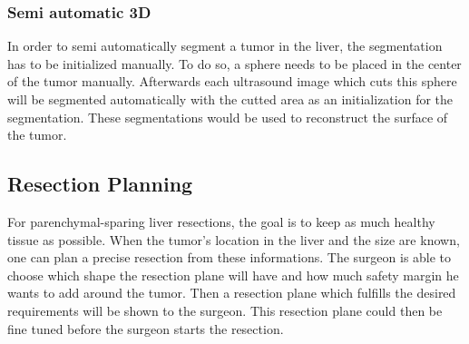 \subsubsection{Semi automatic 3D}
In order to semi automatically segment a tumor in the liver, the segmentation
has to be initialized manually. To do so, a sphere needs to be
placed in the center of the tumor manually. Afterwards each ultrasound image
which cuts this sphere will be segmented automatically with the cutted area as
an initialization for the segmentation. These segmentations would be used to
reconstruct the surface of the tumor.
\subsection{Resection Planning}
For parenchymal-sparing liver resections, the goal is to keep as much healthy tissue as
possible. When the tumor's location in the liver and the size are known, one can plan a
precise resection from these informations. The surgeon is able to choose
which shape the resection plane will have and how much safety margin he wants to
add around the tumor. Then a resection plane which fulfills the desired requirements
will be shown to the surgeon. This resection plane could then be fine tuned before the
surgeon starts the resection.

